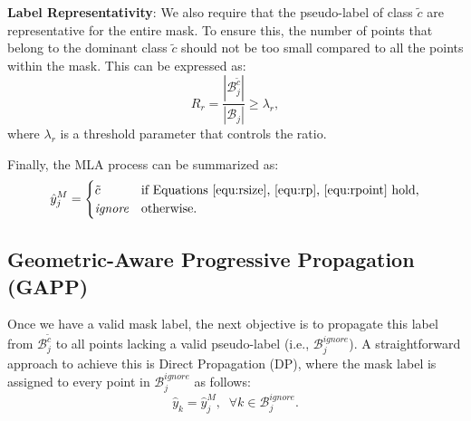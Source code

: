 \textbf{Label Representativity}: We also require that the pseudo-label of class $\tilde{c}$ are representative for the entire mask. To ensure this, the number of points that belong to the dominant class $\tilde{c}$ should not be too small compared to all the points within the mask. This can be expressed as:
\begin{equation}
R_{r} = \frac{|\mathcal{B}_j^{\tilde{c}}|}{|\mathcal{B}_j|} \geq \lambda_r, 
\label{equ:rpoint}
\end{equation}
where $\lambda_r$ is a threshold parameter that controls the ratio.

Finally, the MLA process can be summarized as:
\begin{equation}
\hat{y}_j^{M} = 
\begin{cases}
\tilde{c} & \text{if Equations \ref{equ:rsize}, \ref{equ:rp}, \ref{equ:rpoint} hold,} \\
  \textit{ignore} & \text{otherwise.}
\end{cases}
\end{equation}

\subsection{Geometric-Aware Progressive Propagation (GAPP)} \label{GAPP}

\algo
\tableMain
\tableLabel

Once we have a valid mask label, the next objective is to propagate this label from $\mathcal{B}_j^{\tilde{c}}$ to all points lacking a valid pseudo-label (i.e., $\mathcal{B}_j^{ignore}$). A straightforward approach to achieve this is Direct Propagation (DP), where the mask label is assigned to every point in $\mathcal{B}_j^{ignore}$ as follows:
\begin{equation}
\hat{y}_k = \hat{y}^M_j, \;\; \forall k \in \mathcal{B}_{j}^{ignore}.
\end{equation}

